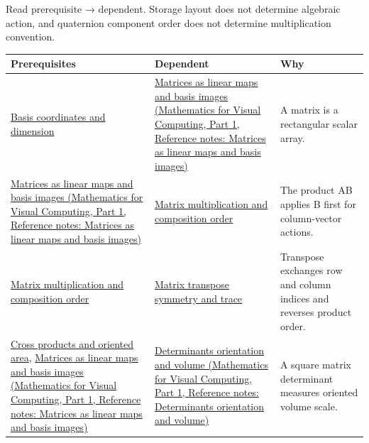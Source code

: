 Read prerequisite → dependent. Storage layout does not determine algebraic action, and quaternion component order does not determine multiplication convention.

{\def\LTcaptype{none} %
\begin{longtable}[]{@{}
  >{\raggedright\arraybackslash}p{}
  >{\raggedright\arraybackslash}p{}
  >{\raggedright\arraybackslash}p{}@{}}
\toprule\noalign{}
\begin{minipage}[b]{\linewidth}\raggedright
Prerequisites
\end{minipage} & \begin{minipage}[b]{\linewidth}\raggedright
Dependent
\end{minipage} & \begin{minipage}[b]{\linewidth}\raggedright
Why
\end{minipage} \\
\midrule\noalign{}
\endhead
\bottomrule\noalign{}
\endlastfoot
\hyperref[appendix-ce0341f7ea0d]{Basis coordinates and dimension} & \href{../02-Mathematics-for-Visual-Computing-P01/main.pdf\#nameddest=appendix-bd39c3bf5d64}{Matrices as linear maps and basis images (Mathematics for Visual Computing, Part 1, Reference notes: Matrices as linear maps and basis images)} & A matrix is a rectangular scalar array. \\
\href{../02-Mathematics-for-Visual-Computing-P01/main.pdf\#nameddest=appendix-bd39c3bf5d64}{Matrices as linear maps and basis images (Mathematics for Visual Computing, Part 1, Reference notes: Matrices as linear maps and basis images)} & \hyperref[appendix-ab31ef447dbf]{Matrix multiplication and composition order} & The product AB applies B first for column-vector actions. \\
\hyperref[appendix-ab31ef447dbf]{Matrix multiplication and composition order} & \hyperref[appendix-175ca5ff874d]{Matrix transpose symmetry and trace} & Transpose exchanges row and column indices and reverses product order. \\
\hyperref[appendix-2391db8052b1]{Cross products and oriented area}, \href{../02-Mathematics-for-Visual-Computing-P01/main.pdf\#nameddest=appendix-bd39c3bf5d64}{Matrices as linear maps and basis images (Mathematics for Visual Computing, Part 1, Reference notes: Matrices as linear maps and basis images)} & \href{../02-Mathematics-for-Visual-Computing-P01/main.pdf\#nameddest=appendix-da478be01d02}{Determinants orientation and volume (Mathematics for Visual Computing, Part 1, Reference notes: Determinants orientation and volume)} & A square matrix determinant measures oriented volume scale. \\

\end{longtable}}
